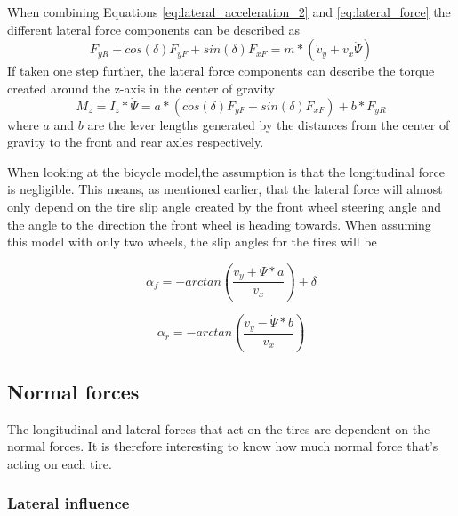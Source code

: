 When combining Equations \ref{eq:lateral_acceleration_2} and \ref{eq:lateral_force} the different lateral force components can be described as
\begin{equation} \label{lateral_forces_2}
	F_{yR} + cos(\delta)F_{yF} + sin(\delta)F_{xF} = m*(\dot v_{y} + v_{x}\dot \Psi)
\end{equation}
If taken one step further, the lateral force components can describe the torque created around the z-axis in the center of gravity 
\begin{equation} \label{lateral_torque}
	M_{z} = I_{z}*\dot \Psi = a*(cos(\delta)F_{yF} + sin(\delta)F_{xF}) + b*F_{yR}
\end{equation}
where $ a $ and $ b $ are the lever lengths generated by the distances from the center of gravity to the front and rear axles respectively. 

When looking at the bicycle model,the assumption is that the longitudinal force is negligible. This means, as mentioned earlier, that the lateral force will almost only depend on the tire slip angle created by the front wheel steering angle and the angle to the direction the front wheel is heading towards. When assuming this model with only two wheels, the slip angles for the tires will be \cite{pacejka}

\begin{equation} \label{eq:wheel_slip_front}
	\alpha _{f} = -arctan(\dfrac{v_{y} + \dot \Psi *a}{v_{x}}) + \delta
\end{equation}

\begin{equation} \label{eq:wheel_slip_rear}
\alpha _{r} = -arctan(\dfrac{v_{y} - \dot \Psi *b}{v_{x}})
\end{equation}

\subsection{Normal forces}

The longitudinal and lateral forces that act on the tires are dependent on the normal forces. It is therefore interesting to know how much normal force that's acting on each tire.

\subsubsection{Lateral influence}

